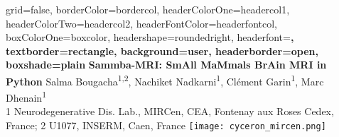 \documentclass[a0paper,portrait]{baposter}
\begin{document}

\begin{poster}{
grid=false,
borderColor=bordercol, %
headerColorOne=headercol1, %
headerColorTwo=headercol2, %
headerFontColor=headerfontcol, %
boxColorOne=boxcolor, %
headershape=roundedright, %
headerfont=\Large\sf\bf, %
textborder=rectangle,
background=user,
headerborder=open, %
boxshade=plain
}
{}
%
%
{\sf\bf \LARGE{Sammba-MRI: SmAll MaMmals BrAin MRI in Python}} %
{\vspace{1em} Salma Bougacha{\textsuperscript{1,2}}, Nachiket Nadkarni\textsuperscript{1}, Cl\'ement Garin\textsuperscript{1}, Marc Dhenain\textsuperscript{1}\\ %
{\small 1  Neurodegenerative Dis. Lab., MIRCen, CEA, Fontenay aux Roses Cedex, France;
2  U1077, INSERM, Caen, France}} %
{\texttt{[image: cyceron\_mircen.png]}} %


\end{poster}
\end{document}
